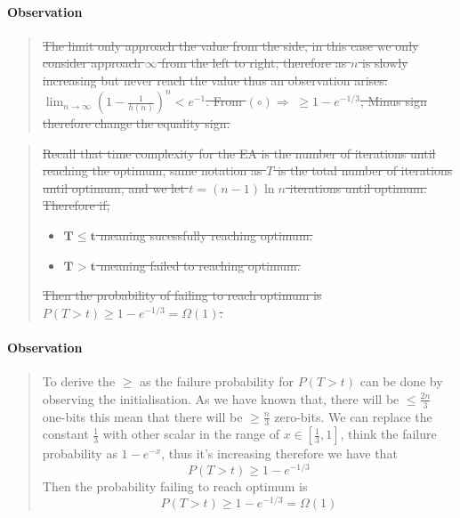 \documentclass[a4paper, 12pt]{article}
\begin{document}
        \paragraph{Observation}
            \begin{quote}
                \sout{The limit only approach the value from the side, in this case we only consider approach $\infty$ from the left to right, therefore as $n$ is slowly
                increasing but never reach the value thus an observation arises:
                $\lim_{n\rightarrow\infty}\left(1-\frac{1}{h(n)}\right)^n < e^{-1}$.
                From $(\circ)\Rightarrow\; \geq 1 - e^{-1/3}$, Minus sign therefore change the equality sign.}
            \end{quote}

            \begin{quote}
                \sout{Recall that time complexity for the EA is the number of iterations until reaching the optimum, same notation as $T$ is the total number of iterations
                until optimum, and we let $t = (n-1)\ln n$ iterations until optimum. Therefore if,}
                \begin{itemize}
                    \item \sout{$\boldsymbol{T\leq t}$ meaning sucessfully reaching optimum.}
                    \item \sout{$\boldsymbol{T > t}$ meaning failed to reaching optimum.}
                \end{itemize}
                \sout{Then the probability of failing to reach optimum is $P(T > t) \geq 1-e^{-1/3} = \Omega(1)$.}
            \end{quote}
        \paragraph{Observation}
            \begin{quote}
                To derive the $\geq$ as the failure probability for $P(T > t)$ can be done by observing the initialisation. As we have known that,
                there will be $\leq\frac{2n}{3}$ one-bits this mean that there will be $\geq\frac{n}{3}$ zero-bits. We can replace the constant $\frac{1}{3}$ with
                other scalar in the range of $x\in\left[\frac{1}{3},1\right]$, think the failure probability as $1-e^{-x}$, thus it's increasing therefore we have
                that
                \begin{equation*}
                    P(T > t) \geq 1 - e^{-1/3} 
                \end{equation*}
                Then the probability failing to reach optimum is 
                \begin{equation*}
                    P(T > t)\geq  1 - e^{-1/3} =\Omega(1)
                \end{equation*}
            \end{quote}
\end{document}

